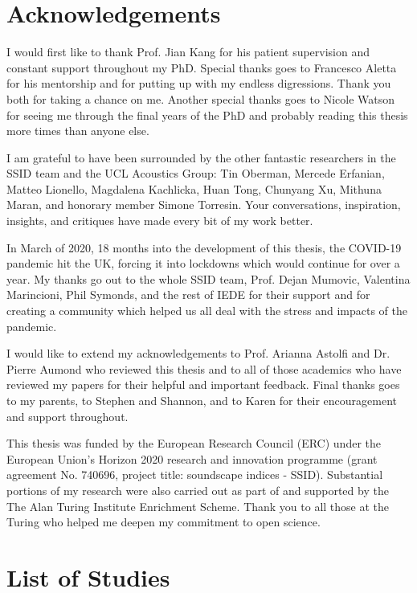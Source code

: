 \documentclass[twoside,fontsize=11pt,titlepage,chapterprefix=true
]{scrbook}
\begin{document}

\chapter*{Acknowledgements}

I would first like to thank Prof. Jian Kang for his patient supervision and constant support throughout my PhD. Special thanks goes to Francesco Aletta for his mentorship and for putting up with my endless digressions. Thank you both for taking a chance on me. Another special thanks goes to Nicole Watson for seeing me through the final years of the PhD and probably reading this thesis more times than anyone else. 

I am grateful to have been surrounded by the other fantastic researchers in the SSID team and the UCL Acoustics Group: Tin Oberman, Mercede Erfanian, Matteo Lionello, Magdalena Kachlicka, Huan Tong, Chunyang Xu, Mithuna Maran, and honorary member Simone Torresin. Your conversations, inspiration, insights, and critiques have made every bit of my work better. 

In March of 2020, 18 months into the development of this thesis, the COVID-19 pandemic hit the UK, forcing it into lockdowns which would continue for over a year. My thanks go out to the whole SSID team, Prof. Dejan Mumovic, Valentina Marincioni, Phil Symonds, and the rest of IEDE for their support and for creating a community which helped us all deal with the stress and impacts of the pandemic. 

I would like to extend my acknowledgements to Prof. Arianna Astolfi and Dr. Pierre Aumond who reviewed this thesis and to all of those academics who have reviewed my papers for their helpful and important feedback. Final thanks goes to my parents, to Stephen and Shannon, and to Karen for their encouragement and support throughout.

This thesis was funded by the European Research Council (ERC) under the European Union’s Horizon 2020 research and innovation programme (grant agreement No. 740696, project title: soundscape indices - SSID). Substantial portions of my research were also carried out as part of and supported by the The Alan Turing Institute Enrichment Scheme. Thank you to all those at the Turing who helped me deepen my commitment to open science.

\chapter*{List of Studies}
\end{document}
